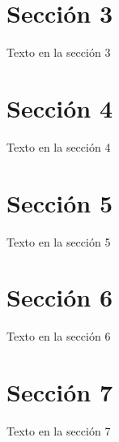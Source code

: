 \documentclass[10pt, notumble, letterpaper]{leaflet}
\begin{document}
\newpage

\section{Sección 3}

Texto en la sección 3

\newpage

\section{Sección 4}

Texto en la sección 4

\newpage

\section{Sección 5}

Texto en la sección 5

\newpage
\pagecolor{blue}
\section{Sección 6}

Texto en la sección 6

\section{Sección 7}

Texto en la sección 7
\end{document}
